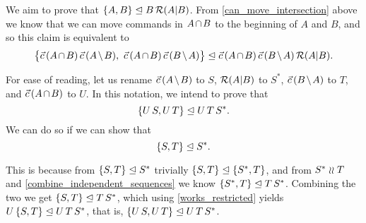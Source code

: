 We aim to prove that ${\{{A,B}\}}\trianglelefteq{B\,\mathcal{R}({A}|{B})}$.
From \cref{can_move_intersection} above we know that we can move commands in $\acbnp$
to the beginning of $A$ and $B$, and so this claim is equivalent to
\[ \worksm{\big\{\acb\cc\amb,~ \acb\cc\bma\big\}}{\acb\cc \bma\cc \reca}. \]

For ease of reading, let us rename
 $\amb$ to $S$,
 $\mathcal{R}({A}|{B})$ to $S^*$,
 $\bma$ to $T$,
 and $\acb$ to $U$.
In this notation, we intend to prove that
\[ {\{{U\, S,U\, T}\}}\trianglelefteq{U\,T\,S^*}. \]
We can do so if we can show that
\[ {\{{S,T}\}}\trianglelefteq{S^*}. \]

This is because from ${\{{S,T}\}}\trianglelefteq{S^*}$ trivially ${\{{S,T}\}}\trianglelefteq{\{{S^*, T}\}}$,
and from $S^* \mathrel{\wr\wr} T$ and \cref{combine_independent_sequences} we know 
${\{{S^*,T}\}}\trianglelefteq{T\,S^*}$.
Combining the two we get ${\{{S,T}\}}\trianglelefteq{T\,S^*}$,
which using \cref{works_restricted} yields
${U\,\{S,T\}}\trianglelefteq{U\,T\,S^*}$, that is,
${\{{U\, S,U\, T}\}}\trianglelefteq{U\,T\,S^*}$.

